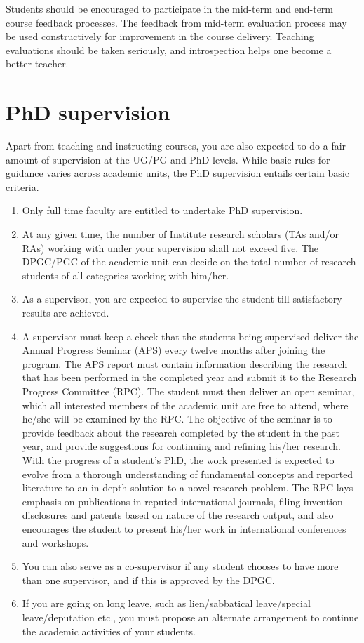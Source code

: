 \documentclass[
  10pt,
  a5paper,
  10pt,
  openany]{amsbook}
\providecommand{\tightlist}{%
  \setlength{\itemsep}{0pt}\setlength{\parskip}{0pt}}
\begin{document}
Students should be encouraged to participate in the mid-term and
end-term course feedback processes. The feedback from mid-term
evaluation process may be used constructively for improvement in the
course delivery. Teaching evaluations should be taken seriously, and
introspection helps one become a better teacher.

\section{PhD supervision}\label{phd-supervision}

Apart from teaching and instructing courses, you are also expected to do
a fair amount of supervision at the UG/PG and PhD levels. While basic
rules for guidance varies across academic units, the PhD supervision
entails certain basic criteria.

\begin{enumerate}
\def\labelenumi{\arabic{enumi}.}
\tightlist
\item
  Only full time faculty are entitled to undertake PhD supervision.
\item
  At any given time, the number of Institute research scholars (TAs
  and/or RAs) working with under your supervision shall not exceed five.
  The DPGC/PGC of the academic unit can decide on the total number of
  research students of all categories working with him/her.
\item
  As a supervisor, you are expected to supervise the student till
  satisfactory results are achieved.
\item
  A supervisor must keep a check that the students being supervised
  deliver the Annual Progress Seminar (APS) every twelve months after
  joining the program. The APS report must contain information
  describing the research that has been performed in the completed year
  and submit it to the Research Progress Committee (RPC). The student
  must then deliver an open seminar, which all interested members of the
  academic unit are free to attend, where he/she will be examined by the
  RPC. The objective of the seminar is to provide feedback about the
  research completed by the student in the past year, and provide
  suggestions for continuing and refining his/her research. With the
  progress of a student's PhD, the work presented is expected to evolve
  from a thorough understanding of fundamental concepts and reported
  literature to an in-depth solution to a novel research problem. The
  RPC lays emphasis on publications in reputed international journals,
  filing invention disclosures and patents based on nature of the
  research output, and also encourages the student to present his/her
  work in international conferences and workshops.
\item
  You can also serve as a co-supervisor if any student chooses to have
  more than one supervisor, and if this is approved by the DPGC.
\item
  If you are going on long leave, such as lien/sabbatical leave/special
  leave/deputation etc., you must propose an alternate arrangement to
  continue the academic activities of your students.
\end{enumerate}
\end{document}

